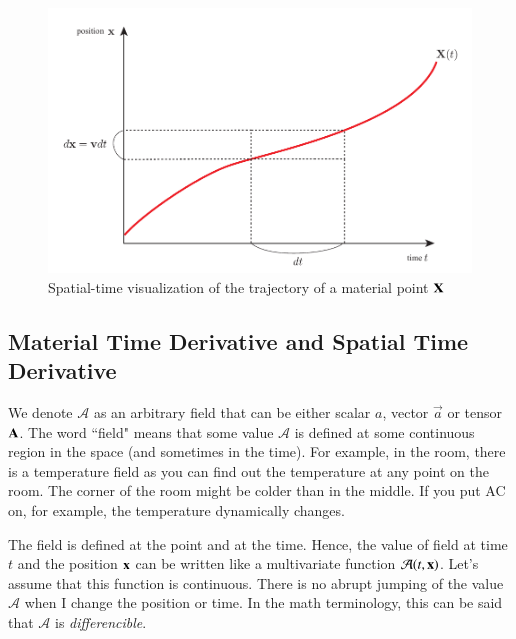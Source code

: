 \begin{figure}[htbp!]
\centering
\includegraphics[width=160mm]{images/material_point.pdf}
\caption{Spatial-time visualization of the trajectory of a material point $\mathbf{X}$ }
\end{figure}  





\subsection{Material Time Derivative and Spatial Time Derivative}

We denote $\mathcal{A}$ as an arbitrary field that can be either scalar $a$, vector $\vec{a}$ or tensor $\mathbf{A}$. 
%
The word ``field" means that some value $\mathcal{A}$ is defined at some continuous region in the space (and sometimes in the time).
%
For example, in the room, there is a temperature field as you can find out the temperature at any point on the room. 
%
The corner of the room might be colder than in the middle.
%
If you put AC on, for example, the temperature dynamically changes. 



The field is defined at the point and at the time. 
%
Hence, the value of field at time $t$ and the position $\mathbf{x}$ can be written like a multivariate function $\mathcal{A}(t,\mathbf{x})$. 
%
Let's assume that this function is continuous. 
%
There is no abrupt jumping of the value $\mathcal{A}$ when I change the position or time.
%
In the math terminology, this can be said that $\mathcal{A}$ is \textit{differencible}.









